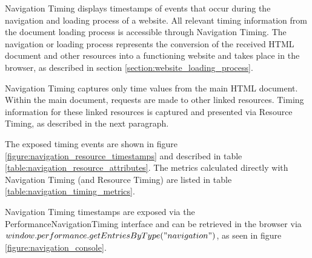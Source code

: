 

Navigation Timing displays timestamps of events that occur during the navigation and loading process of a website.
All relevant timing information from the document loading process is accessible through Navigation Timing.
The navigation or loading process represents the conversion of the received HTML document and other resources into a functioning website and takes place in the browser, as described in section \ref{section:website_loading_process}. %

Navigation Timing captures only time values from the main HTML document.
Within the main document, requests are made to other linked resources.
Timing information for these linked resources is captured and presented via Resource Timing, as described in the next paragraph. %

The exposed timing events are shown in figure \ref{figure:navigation_resource_timestamps} and described in table \ref{table:navigation_resource_attributes}.
The metrics calculated directly with Navigation Timing (and Resource Timing) are listed in table \ref{table:navigation_timing_metrics}.


Navigation Timing timestamps are exposed via the PerformanceNavigationTiming interface and can be retrieved in the browser via $window.performance.getEntriesByType("navigation")$, as seen in figure \ref{figure:navigation_console}. %



